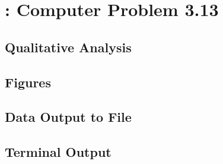 \documentclass[paper=a4, fontsize=11pt]{scrartcl}
\numberwithin{equation}{section}		%
\numberwithin{figure}{section}			%
\numberwithin{table}{section}				%
\begin{document}
\vspace{4mm}
\section{: Computer Problem 3.13}

\vspace{4mm}
\subsection{Qualitative Analysis}

\vspace{4mm}
\subsection{Figures}

\vspace{4mm}
\subsection{Data Output to File}

\vspace{4mm}
\subsection{Terminal Output}
\begin{verbatim}
\end{verbatim}



\end{document}
